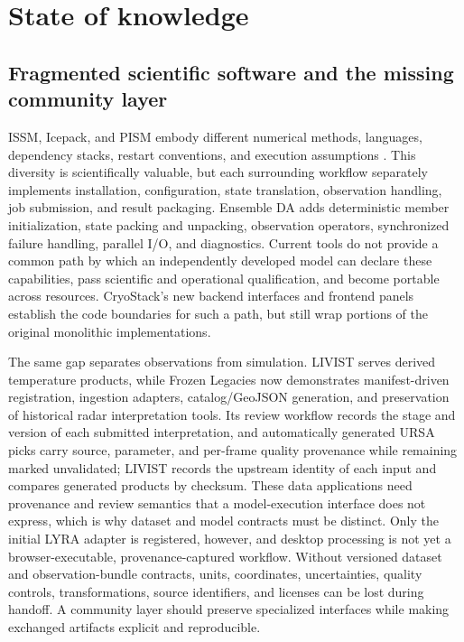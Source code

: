 \section{State of knowledge}
\label{sec:SOK}

\subsection{Fragmented scientific software and the missing community layer}

ISSM, Icepack, and PISM embody different numerical methods, languages,
dependency stacks, restart conventions, and execution assumptions
\citep{larour2012,shapero2021,pism2026}. This diversity is scientifically
valuable, but each surrounding workflow separately implements installation,
configuration, state translation, observation handling, job submission, and
result packaging. Ensemble DA adds deterministic member initialization,
state packing and unpacking, observation operators, synchronized failure
handling, parallel I/O, and diagnostics. Current tools do not provide a common
path by which an independently developed model can declare these capabilities,
pass scientific and operational qualification, and become portable across
resources. CryoStack's new backend interfaces and frontend panels establish
the code boundaries for such a path, but still wrap portions of the original
monolithic implementations.

The same gap separates observations from simulation. LIVIST serves derived
temperature products, while Frozen Legacies now demonstrates manifest-driven
registration, ingestion adapters, catalog/GeoJSON generation, and preservation
of historical radar interpretation tools. Its review workflow records the stage
and version of each submitted interpretation, and automatically generated URSA
picks carry source, parameter, and per-frame quality provenance while remaining
marked unvalidated; LIVIST records the upstream identity of each input and
compares generated products by checksum. These data applications need
provenance and review semantics that a model-execution interface does not
express, which is why dataset and model contracts must be distinct. Only the
initial LYRA adapter is registered, however, and desktop processing is not yet a browser-executable,
provenance-captured workflow. Without versioned dataset and
observation-bundle contracts, units, coordinates, uncertainties, quality
controls, transformations, source identifiers, and licenses can be lost
during handoff. A community layer should preserve specialized interfaces
while making exchanged artifacts explicit and reproducible.

